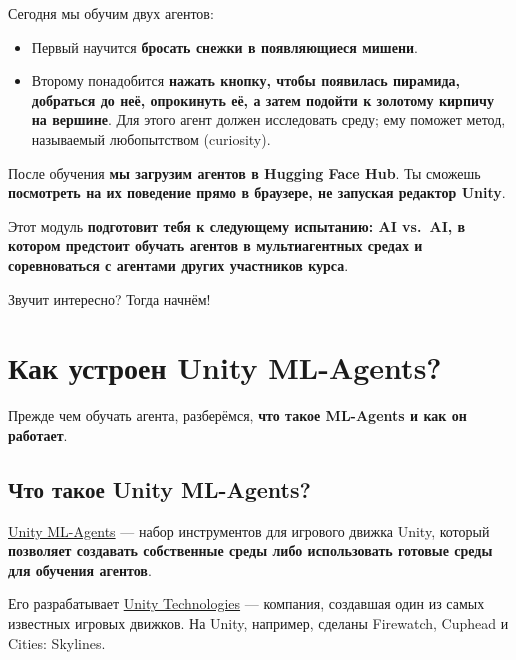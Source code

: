 \documentclass[11pt,a4paper]{article}
\begin{document}
Сегодня мы обучим двух агентов:

\begin{itemize}
\tightlist
\item
  Первый научится \textbf{бросать снежки в появляющиеся мишени}.
\item
  Второму понадобится \textbf{нажать кнопку, чтобы появилась пирамида, добраться до неё, опрокинуть её, а затем подойти к золотому кирпичу на вершине}. Для этого агент должен исследовать среду; ему поможет метод, называемый любопытством (curiosity).
\end{itemize}


После обучения \textbf{мы загрузим агентов в Hugging Face Hub}. Ты сможешь \textbf{посмотреть на их поведение прямо в браузере, не запуская редактор Unity}.

Этот модуль \textbf{подготовит тебя к следующему испытанию: AI vs.~AI, в котором предстоит обучать агентов в мультиагентных средах и соревноваться с агентами других участников курса}.

Звучит интересно? Тогда начнём!

\section{Как устроен Unity ML-Agents?}\label{how-do-unity-ml-agents-work}

Прежде чем обучать агента, разберёмся, \textbf{что такое ML-Agents и как он работает}.

\subsection{Что такое Unity ML-Agents?}\label{what-is-unity-ml-agents}

\href{https://github.com/Unity-Technologies/ml-agents}{Unity ML-Agents} --- набор инструментов для игрового движка Unity, который \textbf{позволяет создавать собственные среды либо использовать готовые среды для обучения агентов}.

Его разрабатывает \href{https://unity.com/}{Unity Technologies} --- компания, создавшая один из самых известных игровых движков. На Unity, например, сделаны Firewatch, Cuphead и Cities: Skylines.

\end{document}
